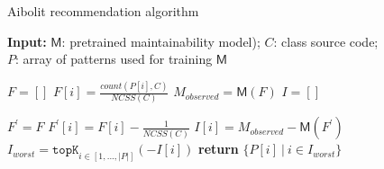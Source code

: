 \begin{algorithm}[t]
\caption{Aibolit recommendation algorithm}
\hspace{\algorithmicindent}
\textbf{Input:}  $\mathsf{M}$: pretrained
maintainability model); $C$: class source code; \\
\hspace{\algorithmicindent} $P$: array of patterns used for training $\mathsf{M}$\\

\begin{algorithmic}[1]
\State $F = [ ]$ \label{line:init_F}
\State $F[i] =\frac{\textit{count}(P[i], C)}{\textit{NCSS}(C)}$%
\EndFor \State $M_{\textit{observed}} = \mathsf{M}(F)$ \label{line:compute_m_source}
\State $I = [ ]$ \label{line:init_I}

\State $F^{\prime} = F$
\State $F^{\prime}[i] = F[i] - \frac{1}{\textit{NCSS}(C)}$ \label{line:f_prime} %
\State $I[i] = M_{\textit{observed}} - \mathsf{M}(F^{\prime})$ \label{line:impact} %
\EndFor
\State $I_{\textit{worst}} = \texttt{topK}_{i \in [1,...,|P|]} (-I[i])$ \label{line:topK}
\State \textbf{return} $\{P[i]~|~i \in I_{\textit{worst}}\}$ \label{line:return}

\end{algorithmic}
\centering
\label{fig:recsys_alg}
\end{algorithm}





